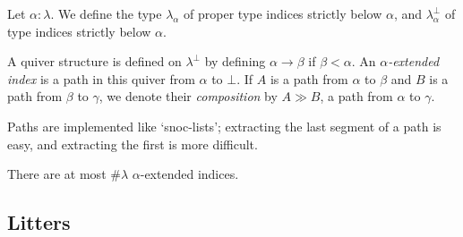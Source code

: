 \documentclass{article}
\begin{document}
\begin{definition}
    Let \( \alpha : \lambda \).
    We define the type \( \lambda_\alpha \) of proper type indices strictly below \( \alpha \), and \( \lambda_\alpha^\bot \) of type indices strictly below \( \alpha \).
\end{definition}
\begin{definition}
    A quiver structure is defined on \( \lambda^\bot \) by defining \( \alpha \longrightarrow \beta \) if \( \beta < \alpha \).
    An \emph{\( \alpha \)-extended index} is a path in this quiver from \( \alpha \) to \( \bot \).
    If \( A \) is a path from \( \alpha \) to \( \beta \) and \( B \) is a path from \( \beta \) to \( \gamma \), we denote their \emph{composition} by \( A \gg B \), a path from \( \alpha \) to \( \gamma \).
\end{definition}
\begin{remark}
    Paths are implemented like `snoc-lists'; extracting the last segment of a path is easy, and extracting the first is more difficult.
\end{remark}
\begin{lemma}
    There are at most \( \#\lambda \) \( \alpha \)-extended indices.
\end{lemma}

\subsection{Litters}
\end{document}
